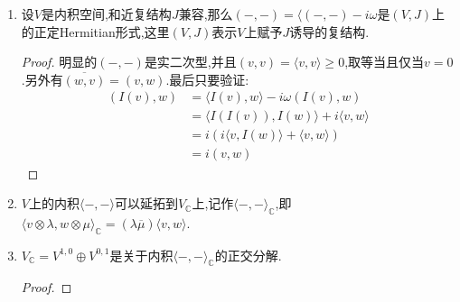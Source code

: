 \begin{enumerate}
\begin{enumerate}[(1)]
\begin{proof}
    		明显的$\omega$是实交错二次型.而$\omega\in\bigwedge^{1,1}V^*$只要选取一组基算一下.
    	\end{proof}
    	\item 设$V$是内积空间,和近复结构$J$兼容,那么$(-,-)=\langle(-,-)-i\omega$是$(V,J)$上的正定Hermitian形式,这里$(V,J)$表示$V$上赋予$J$诱导的复结构.
    	\begin{proof}
    		
    		明显的$(-,-)$是实二次型,并且$(v,v)=\langle v,v\rangle\ge0$,取等当且仅当$v=0$.另外有$\overline{(w,v)}=(v,w)$.最后只要验证:
    		\begin{align*}
    			(I(v),w)&=\langle I(v),w\rangle-i\omega(I(v),w)\\
    			&=\langle I(I(v)),I(w)\rangle+i\langle v,w\rangle\\
    			&=i\left(i\langle v,I(w)\rangle+\langle v,w\rangle\right)\\
    			&=i(v,w)
    		\end{align*}
    	\end{proof}
        \item $V$上的内积$\langle-,-\rangle$可以延拓到$V_{\mathbb{C}}$上,记作$\langle-,-\rangle_{\mathbb{C}}$,即$\langle v\otimes\lambda,w\otimes\mu\rangle_{\mathbb{C}}=(\lambda\overline{\mu})\langle v,w\rangle$.
        \item $V_{\mathbb{C}}=V^{1,0}\oplus V^{0,1}$是关于内积$\langle-,-\rangle_{\mathbb{C}}$的正交分解.
        \begin{proof}
        	

\end{proof}
\end{enumerate}
\end{enumerate}
